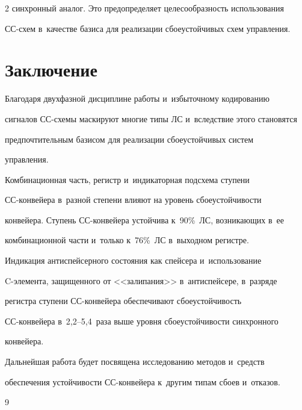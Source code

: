 \begin{multicols}{2}
синхронный аналог. Это предопределяет целесообразность использования  

СС-схем в~качестве базиса для реализации сбоеустойчивых схем управления.

  

\section{Заключение}



  Благодаря двухфазной дисциплине работы и~избыточному кодированию 

сигналов СС-схе\-мы маскируют многие типы ЛС и~вследствие этого становятся 

предпочтительным базисом для реализации сбоеустойчивых систем 

управ\-ления.

  

  Комбинационная часть, регистр и~индикаторная подсхема ступени  

СС-кон\-вей\-ера в~разной степени влияют на уровень сбоеустойчивости 

конвейера. Ступень СС-кон\-вей\-ера устойчива к~90\%~ЛС, возникающих в~ее 

комбинационной части и~только к~76\%~ЛС в~выходном регистре. 

  

  Индикация антиспейсерного состояния как спейсера и~использование  

C-эле\-мен\-та, защищенного от <<залипания>> в~антиспейсере, в~разряде 

регистра ступени СС-кон\-вей\-ера обеспечивают сбоеустойчивость  

СС-кон\-вей\-ера в~2,2--5,4~раза выше уровня сбоеустойчивости синхронного 

конвейера.

  

  Дальнейшая работа будет посвящена исследованию методов и~средств 

обеспечения устойчивости СС-кон\-вей\-ера к~другим типам сбоев и~отказов.

  

{\small\frenchspacing

 {%


 \begin{thebibliography}{9}



\end{thebibliography}}}
\end{multicols}
